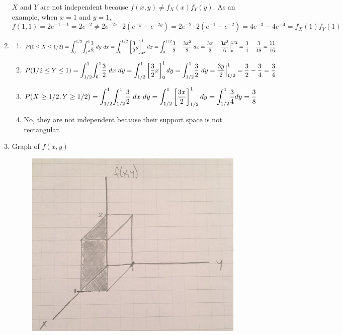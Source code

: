\documentclass{article}
\newcommand\lint{\mathlarger{\int}}
\begin{document}
\begin{enumerate}
      $X$ and $Y$ are not independent because $f(x,y) \ne f_X(x)f_Y(y)$. As an example, when 
      $x=1$ and $y=1$,
      $$f(1,1) = 2e^{-1-1} = 2e^{-2} \ne 2e^{-2x}\cdot2(e^{-y}-e^{-2y}) 
	= 2e^{-2}\cdot2(e^{-1} - e^{-2}) = 4e^{-3} - 4e^{-4} = f_X(1)f_Y(1)$$
     
     \item
      \begin{enumerate}
       \item 
	$P(0 \le X \le 1/2) = \lint_0^{1/2} \lint_{x^2}^1 {\dfrac{3}{2}\ dy\ dx}
	  = \lint_0^{1/2} \left[\dfrac{3}{2}y\right]_{x^2}^1 dx
	  = \lint_0^{1/2} {\dfrac{3}{2} - \dfrac{3x^2}{2}\ dx} \\
	  = \dfrac{3x}{2} - \dfrac{3x^3}{6} \Big|_0^{1/2}
	  = \dfrac{3}{4} - \dfrac{3}{48} = \dfrac{11}{16}$
       
       \item
	$P(1/2 \le Y \le 1) = \lint_{1/2}^1 \lint_{0}^1 {\dfrac{3}{2}\ dx\ dy}
	  = \lint_{1/2}^1 \left[\dfrac{3}{2}x\right]_{0}^1 dy
	  = \lint_{1/2}^1 \dfrac{3}{2}\ dy \\
	  = \dfrac{3y}{2} \Big|_{1/2}^1 
	  = \dfrac{3}{2} - \dfrac{3}{4} = \dfrac{3}{4} $
       
       \item
	$P(X \ge 1/2, Y \ge 1/2) = \lint_{1/2}^1 \lint_{1/2}^1 {\dfrac{3}{2}\ dx\ dy}
	  = \lint_{1/2}^1 \left[\dfrac{3x}{2}\right]_{1/2}^1 dy
	  = \lint_{1/2}^1 \dfrac{3}{4} dy
	  = \dfrac{3}{8}$
       
       \item
	No, they are not independent because their support space is not rectangular.
      \end{enumerate}
     \addtocounter{enumi}{8}
     
     \newpage
     \item
      Graph of $f(x,y)$
      \begin{figure}[h!]
	\centering
	\includegraphics[scale=.2,keepaspectratio=true]{./images/graph1.jpg}
      \end{figure}
      

\end{enumerate}
\end{document}
